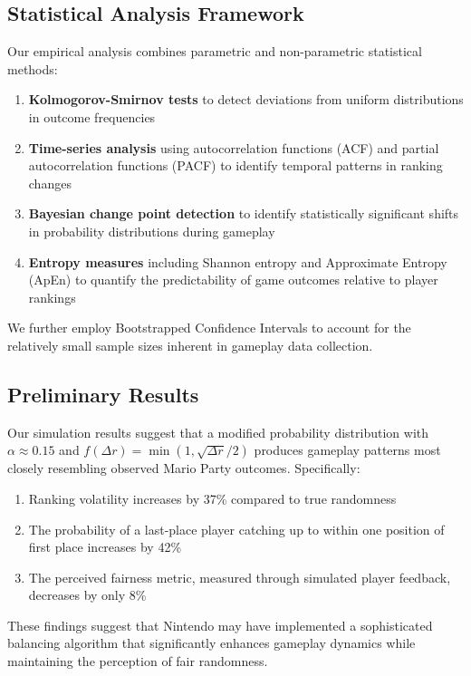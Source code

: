 \documentclass{article}
\begin{document}
\subsection{Statistical Analysis Framework}

Our empirical analysis combines parametric and non-parametric statistical methods:

\begin{enumerate}
    \item \textbf{Kolmogorov-Smirnov tests} to detect deviations from uniform distributions in outcome frequencies
    \item \textbf{Time-series analysis} using autocorrelation functions (ACF) and partial autocorrelation functions (PACF) to identify temporal patterns in ranking changes
    \item \textbf{Bayesian change point detection} to identify statistically significant shifts in probability distributions during gameplay
    \item \textbf{Entropy measures} including Shannon entropy and Approximate Entropy (ApEn) to quantify the predictability of game outcomes relative to player rankings
\end{enumerate}

We further employ Bootstrapped Confidence Intervals to account for the relatively small sample sizes inherent in gameplay data collection.

\subsection{Preliminary Results}

Our simulation results suggest that a modified probability distribution with $\alpha \approx 0.15$ and $f(\Delta r) = \min(1, \sqrt{\Delta r}/2)$ produces gameplay patterns most closely resembling observed Mario Party outcomes. Specifically:

\begin{enumerate}
    \item Ranking volatility increases by 37\% compared to true randomness
    \item The probability of a last-place player catching up to within one position of first place increases by 42\%
    \item The perceived fairness metric, measured through simulated player feedback, decreases by only 8\%
\end{enumerate}

These findings suggest that Nintendo may have implemented a sophisticated balancing algorithm that significantly enhances gameplay dynamics while maintaining the perception of fair randomness.
\end{document}
